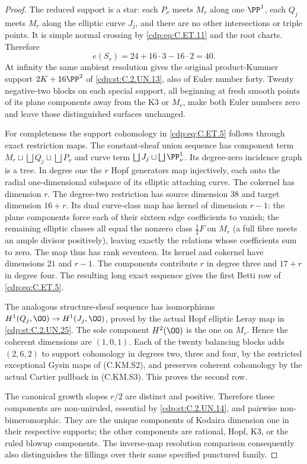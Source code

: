 \begin{proof}
The reduced support is a star:
each $P_\nu$ meets $M_r$ along
one $\PP^1$, each $Q_j$ meets
$M_r$ along the elliptic curve
$J_j$, and there are no other
intersections or triple points.
It is simple normal crossing
by \eqref{cdp:eq:C.ET.11} and the root charts.
Therefore
\[
                 e(S_r)=24+16\cdot3-16\cdot2=40.
                                                               \tag{C.ET.12}\label{cdp:eq:C.ET.12}
\]
At infinity the same ambient
resolution gives the original
product-Kummer support
$2K+16\PP^2$ of \ref{cdp:st:C.2.UN.13}, also
of Euler number forty.
Twenty negative-two blocks
on each special support,
all beginning at fresh
smooth points of its plane
components away from the
K3 or $M_r$, make both
Euler numbers zero and
leave those distinguished
surfaces unchanged.

For completeness the support
cohomology in \eqref{cdp:eq:C.ET.5} follows
through exact restriction maps.
The constant-sheaf union
sequence has component term
$M_r\sqcup\bigsqcup Q_j
\sqcup\bigsqcup P_\nu$
and curve term
$\bigsqcup J_j\sqcup
\bigsqcup\PP^1_\nu$.
Its degree-zero incidence
graph is a tree. In degree
one the $r$ Hopf generators
map injectively, each onto
the radial one-dimensional
subspace of its elliptic
attaching curve. The cokernel
has dimension $r$.
The degree-two restriction
has source dimension $38$
and target dimension $16+r$.
Its dual curve-class map
has kernel of dimension
$r-1$: the plane components
force each of their sixteen
edge coefficients to vanish;
the remaining elliptic
classes all equal the
nonzero class $\tfrac12F$
on $M_r$ (a full fibre meets
an ample divisor positively), leaving exactly
the relations whose
coefficients sum to zero.
The map thus has rank
seventeen. Its kernel
and cokernel have dimensions
$21$ and $r-1$.
The components contribute
$r$ in degree three and
$17+r$ in degree four.
The resulting long exact
sequence gives the first
Betti row of \eqref{cdp:eq:C.ET.5}.

The analogous structure-sheaf
sequence has isomorphisms
$H^1(Q_j,\OO)\to H^1(J_j,\OO)$,
proved by the actual Hopf
elliptic Leray map in \ref{cdp:st:C.2.UN.25}.
The sole component
$H^2(\OO)$ is the one
on $M_r$. Hence the
coherent dimensions are
$(1,0,1)$.
Each of the twenty
balancing blocks adds
$(2,6,2)$ to support
cohomology in degrees
two, three and four,
by the restricted
exceptional Gysin maps
of (C.KM.S2), and
preserves coherent
cohomology by the
actual Cartier pullback
in (C.KM.S3). This
proves the second row.

The canonical growth slopes
$r/2$ are distinct and
positive. Therefore these
components are non-uniruled,
essential by \ref{cdp:st:C.2.UN.14}, and
pairwise non-bimeromorphic.
They are the unique components
of Kodaira dimension one
in their respective supports;
the other components are
rational, Hopf, K3, or
the ruled blowup components.
The inverse-map resolution
comparison consequently
also distinguishes the
fillings over their same
specified punctured family.
\end{proof}


